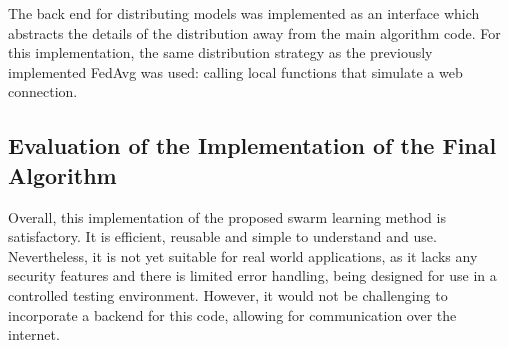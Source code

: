 The back end for distributing models was implemented as an interface which abstracts the details of the distribution away from the main algorithm code. For this implementation, the same distribution strategy as the previously implemented FedAvg was used: calling local functions that simulate a web connection.

\subsection{Evaluation of the Implementation of the Final Algorithm}
Overall, this implementation of the proposed swarm learning method is satisfactory. It is efficient, reusable and simple to understand and use. Nevertheless, it is not yet suitable for real world applications, as it lacks any security features and there is limited error handling, being designed for use in a controlled testing environment. However, it would not be challenging to incorporate a backend for this code, allowing for communication over the internet.